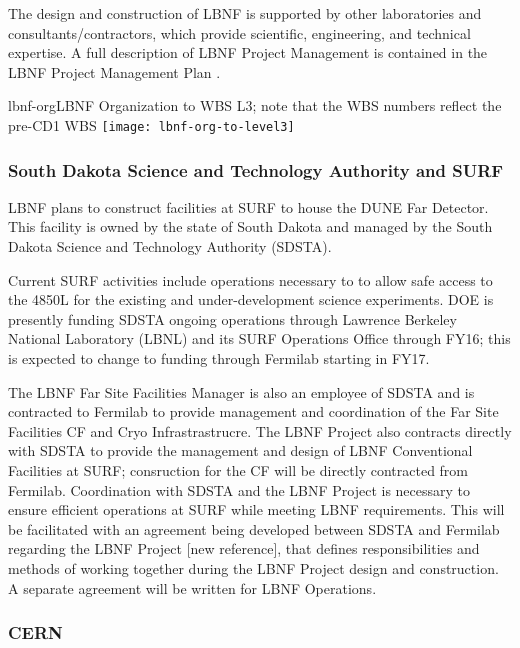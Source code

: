 The design and construction of LBNF is supported by other laboratories and consultants/contractors, which provide scientific, engineering, and technical expertise. A full description of LBNF Project Management is contained in the LBNF Project Management Plan \fixme{[ref]}.

\begin{cdrfigure}{lbnf-org}{LBNF Organization to WBS L3; note that the WBS numbers reflect the pre-CD1 WBS}
  \texttt{[image: lbnf-org-to-level3]}
\end{cdrfigure}

\subsubsection{South Dakota Science and Technology Authority and SURF}

LBNF plans to construct facilities at SURF to house the DUNE Far Detector. This facility is owned by the state of South Dakota and managed by the South Dakota Science and Technology Authority (SDSTA). 

Current SURF activities include operations necessary to to allow safe access to the 4850L for the existing and under-development science experiments. DOE is presently funding SDSTA ongoing operations through Lawrence Berkeley National Laboratory (LBNL) and its SURF Operations Office through FY16; this is expected to change to funding through Fermilab starting in FY17. 

The LBNF Far Site Facilities Manager is also an employee of SDSTA and is contracted to Fermilab to provide management and coordination of the Far Site Facilities CF and Cryo Infrastrastrucre. The LBNF Project also contracts directly with SDSTA to provide the management and design of LBNF Conventional Facilities at SURF; consruction for the CF will be directly contracted from Fermilab. Coordination with SDSTA and the LBNF Project is necessary to ensure efficient operations at SURF while meeting LBNF requirements. This will be facilitated with an agreement being developed between SDSTA and Fermilab regarding the LBNF Project [new reference], that defines responsibilities and methods of working together during the LBNF Project design and construction. A separate agreement will be written for LBNF Operations. 

\subsubsection{CERN}

